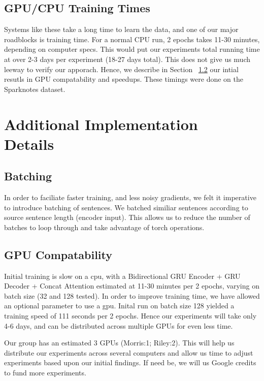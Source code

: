\documentclass[twoside,twocolumn]{article}
\begin{document}
\subsection{GPU/CPU Training Times}
Systems like these take a long time to learn the data, and one of our major
roadblocks is training time. For a normal CPU run, 2 epochs takes 11-30 minutes,
depending on computer specs. This would put our experiments total running time
at over 2-3 days per experiment (18-27 days total). This does not give us much
leeway to verify our
apporach. Hence, we describe in Section ~\ref{sec:gpu} our intial resutls
in GPU compatability and speedups. These timings were done on the Sparknotes
dataset.


\section{Additional Implementation\\Details}
\subsection{Batching}
In order to faciliate faster training, and less noisy gradients, we felt it
imperative to introduce batching of sentences. We batched similiar sentences
according to source sentence length (encoder input). This allows us to reduce
the number of batches to loop through and take advantage of torch operations.

\subsection{GPU Compatability}
\label{sec:gpu}
Initial training is slow on a cpu, with a Bidirectional GRU Encoder
+ GRU Decoder + Concat Attention estimated at 11-30 minutes per 2 epochs,
varying on batch size (32 and 128 tested). In order to improve training time,
we have allowed an optional parameter to use a gpu. Inital run on batch size 128
yielded a training speed of 111 seconds per 2 epochs. Hence our experiments will
take only 4-6 days, and can be distributed across multiple GPUs for even less
time.

Our group has an estimated 3 GPUs (Morris:1; Riley:2). This will help us
distribute our experiments across several computers and allow us time to adjust
experiments based upon our initial findings. If need be, we will us Google
credits to fund more experiments.
\end{document}
